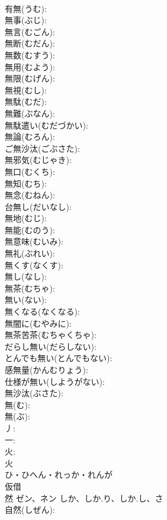 \documentclass[8pt]{extreport}
\begin{document}
\begin{CJK}{UTF8}{min}
\\	有無(うむ): 
\\	無事(ぶじ): 
\\	無言(むごん): 
\\	無断(むだん): 
\\	無数(むすう): 
\\	無用(むよう): 
\\	無限(むげん): 
\\	無視(むし): 
\\	無駄(むだ): 
\\	無難(ぶなん): 
\\	無駄遣い(むだづかい): 
\\	無論(むろん): 
\\	ご無沙汰(ごぶさた): 
\\	無邪気(むじゃき): 
\\	無口(むくち): 
\\	無知(むち): 
\\	無念(むねん): 
\\	台無し(だいなし): 
\\	無地(むじ): 
\\	無能(むのう): 
\\	無意味(むいみ): 
\\	無礼(ぶれい): 
\\	無くす(なくす): 
\\	無し(なし): 
\\	無茶(むちゃ): 
\\	無い(ない): 
\\	無くなる(なくなる): 
\\	無闇に(むやみに): 
\\	無茶苦茶(むちゃくちゃ): 
\\	だらし無い(だらしない): 
\\	とんでも無い(とんでもない): 
\\	感無量(かんむりょう): 
\\	仕様が無い(しようがない): 
\\	無沙汰(ぶさた): 
\\	無(む): 
\\	無(ぶ): 
\\	丿: 
\\	一: 
\\	火: 
\\	火	
\\	ひ・ひへん・れっか・れんが	
\\	仮借 
\\	然	ゼン、ネン	しか、しか.り、しか.し、さ		
\\	自然(しぜん): 

\end{CJK}
\end{document}
